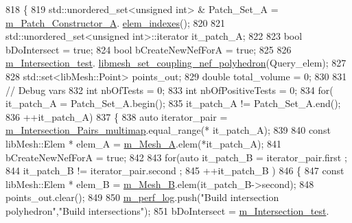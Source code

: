 \begin{DoxyCode}
818     \{
819         std::unordered\_set<unsigned int> & Patch\_Set\_A = \hyperlink{classcarl_1_1_intersection___search_a3bc66e4e9a0b41d9b20093d4f6ca7611}{m\_Patch\_Constructor\_A}.
      \hyperlink{classcarl_1_1_patch__construction_ad92eca042b223e8be1cb3984a3dc8cba}{elem\_indexes}();
820 
821         std::unordered\_set<unsigned int>::iterator it\_patch\_A;
822 
823         \textcolor{keywordtype}{bool} bDoIntersect = \textcolor{keyword}{true};
824         \textcolor{keywordtype}{bool} bCreateNewNefForA = \textcolor{keyword}{true};
825 
826         \hyperlink{classcarl_1_1_intersection___search_afeedb5ff9144638151b7f956cf113fc4}{m\_Intersection\_test}.
      \hyperlink{classcarl_1_1_intersection___tools_acf2d17e703441bc9e3ed05d98f51ba85}{libmesh\_set\_coupling\_nef\_polyhedron}(Query\_elem);
827 
828         std::set<libMesh::Point> points\_out;
829         \textcolor{keywordtype}{double} total\_volume = 0;
830 
831         \textcolor{comment}{// Debug vars}
832         \textcolor{keywordtype}{int} nbOfTests = 0;
833         \textcolor{keywordtype}{int} nbOfPositiveTests = 0;
834         \textcolor{keywordflow}{for}(    it\_patch\_A =  Patch\_Set\_A.begin();
835                 it\_patch\_A != Patch\_Set\_A.end();
836                 ++it\_patch\_A)
837         \{
838             \textcolor{keyword}{auto} iterator\_pair = \hyperlink{classcarl_1_1_intersection___search_a21bb47bfa3021d18b718919ad4a245d7}{m\_Intersection\_Pairs\_multimap}.equal\_range(*
      it\_patch\_A);
839 
840             \textcolor{keyword}{const} libMesh::Elem * elem\_A = \hyperlink{classcarl_1_1_intersection___search_a903b7b3a369ed2c1e80d6a20ba41d350}{m\_Mesh\_A}.elem(*it\_patch\_A);
841             bCreateNewNefForA = \textcolor{keyword}{true};
842 
843             \textcolor{keywordflow}{for}(\textcolor{keyword}{auto} it\_patch\_B = iterator\_pair.first ;
844                      it\_patch\_B != iterator\_pair.second ;
845                      ++it\_patch\_B )
846             \{
847                 \textcolor{keyword}{const} libMesh::Elem * elem\_B = \hyperlink{classcarl_1_1_intersection___search_a178cd617f59285fb858fddd78dec79d6}{m\_Mesh\_B}.elem(it\_patch\_B->second);
848                 points\_out.clear();
849 
850                 \hyperlink{classcarl_1_1_intersection___search_aebe6210287a36909206b1a59f9cd17e0}{m\_perf\_log}.push(\textcolor{stringliteral}{"Build intersection polyhedron"},\textcolor{stringliteral}{"Build intersections"});
851                 bDoIntersect = \hyperlink{classcarl_1_1_intersection___search_afeedb5ff9144638151b7f956cf113fc4}{m\_Intersection\_test}.

\end{DoxyCode}
